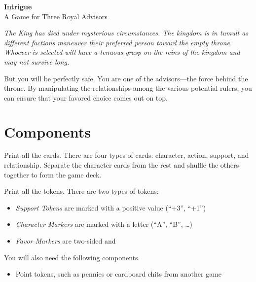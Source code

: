 \documentclass{article}
\begin{document}
\begin{centering}
  \Large{\textbf {Intrigue}}\\
  A Game for Three Royal Advisors\\
\end{centering}

\vspace{0.5cm}

{\itshape The King has died under mysterious circumstances. The
  kingdom is in tumult as different factions maneuver their preferred
  person toward the empty throne.  Whoever is selected will have a
  tenuous grasp on the reins of the kingdom and may not survive long.

  But you will be perfectly safe. You are one of the advisors---the force
  behind the throne. By manipulating the relationships among the
  various potential rulers, you can ensure that your favored
  choice comes out on top.
}

\vspace{0.5cm}

\section{Components}

Print all the cards.
There are four types of cards: character, action, support, and relationship.
Separate the character cards from the rest and shuffle the others together
to form the game deck.

Print all the tokens.
There are two types of tokens:
\begin{itemize}
\item \textit{Support Tokens} are marked with a positive value (``+3'', ``+1'')
\item \textit{Character Markers} are marked with a letter (``A'', ``B'', \ldots)
\item \textit{Favor Markers} are two-sided and 
\end{itemize}


You will also need the following components.
\begin{itemize}
  \item Point tokens, such as pennies or cardboard chits from another game
\end{itemize}
\end{document}

